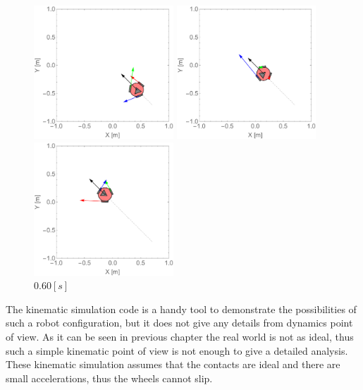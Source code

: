 \documentclass[12pt,english,twoside]{article}
\begin{document}
\begin{figure}[htb!]
	\centering
	\includegraphics[height=5cm]{figures/2d_simulation/animations/2D_move_along_line_and_rotating/20}
	\caption{$0.20[s]$}
	\endminipage\hfill
	\centering
	\includegraphics[height=5cm]{figures/2d_simulation/animations/2D_move_along_line_and_rotating/40}
	\caption{$0.40[s]$}
	\endminipage\hfill
	\centering
	\includegraphics[height=5cm]{figures/2d_simulation/animations/2D_move_along_line_and_rotating/60}
	\caption{$0.60[s]$}
	\endminipage\hfill
\end{figure}
The kinematic simulation code is a handy tool to demonstrate the possibilities of such a robot configuration, but it does not give any details from dynamics point of view. As it can be seen in previous chapter the real world is not as ideal, thus such a simple kinematic point of view is not enough to give a detailed analysis. These kinematic simulation assumes that the contacts are ideal and there are small accelerations, thus the wheels cannot slip.
\newpage
\end{document}
